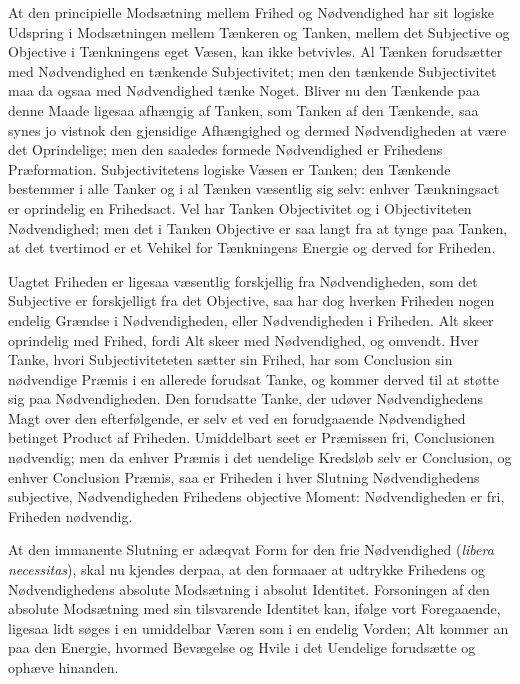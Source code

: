 \documentclass[12pt]{book}
\newcommand{\opage}[1]{\marginnote{\footnotesize\textit{[#1]}}}
\begin{document}
At den principielle Modsætning mellem Frihed og Nødvendighed har sit logiske Udspring i Modsætningen mellem Tænkeren og Tanken, mellem det Subjective og Objective i Tænkningens eget Væsen, kan ikke betvivles. Al Tænken forudsætter med Nødvendighed en tænkende Subjectivitet; men den tænkende Subjectivitet maa da ogsaa med Nødvendighed tænke Noget. Bliver nu den Tænkende paa denne Maade ligesaa afhængig af Tanken, som Tanken af den Tænkende, saa synes jo vistnok den gjensidige Afhængighed og dermed Nødvendigheden at være det Oprindelige; men den saaledes formede Nødvendighed er Frihedens Præformation. Subjectivitetens logiske Væsen er Tanken; den Tænkende bestemmer
\opage{366}i alle Tanker og i al Tænken væsentlig sig selv: enhver Tænkningsact er oprindelig en Frihedsact. Vel har Tanken Objectivitet og i Objectiviteten Nødvendighed; men det i Tanken Objective er saa langt fra at tynge paa Tanken, at det tvertimod er et Vehikel for Tænkningens Energie og derved for Friheden.

Uagtet Friheden er ligesaa væsentlig forskjellig fra Nødvendigheden, som det Subjective er forskjelligt fra det Objective, saa har dog hverken Friheden nogen endelig Grændse i Nødvendigheden, eller Nødvendigheden i Friheden. Alt skeer oprindelig med Frihed, fordi Alt skeer med Nødvendighed, og omvendt. Hver Tanke, hvori Subjectiviteteten %
sætter sin Frihed, har som Conclusion sin nødvendige Præmis i en allerede forudsat Tanke, og kommer derved til at støtte sig paa Nødvendigheden. Den forudsatte Tanke, der udøver Nødvendighedens Magt over den efterfølgende, er selv et ved en forudgaaende Nødvendighed betinget Product af Friheden. Umiddelbart seet er Præmissen fri, Conclusionen nødvendig; men da enhver Præmis i det uendelige Kredsløb selv er Conclusion, og enhver Conclusion Præmis, saa er Friheden i hver Slutning Nødvendighedens subjective, Nødvendigheden Frihedens objective Moment: Nødvendigheden er fri, Friheden nødvendig.

At den immanente Slutning er adæqvat Form for den frie Nødvendighed (\textit{libera necessitas}), skal nu kjendes derpaa, at den formaaer at udtrykke Frihedens og Nødvendighedens absolute Modsætning i absolut Identitet. Forsoningen af den absolute Modsætning med sin tilsvarende Identitet kan, ifølge vort Foregaaende, ligesaa lidt søges i en umiddelbar Væren som i en endelig Vorden; Alt kommer an paa den Energie, hvormed Bevægelse og Hvile i det Uendelige forudsætte og ophæve hinanden.
\end{document}
